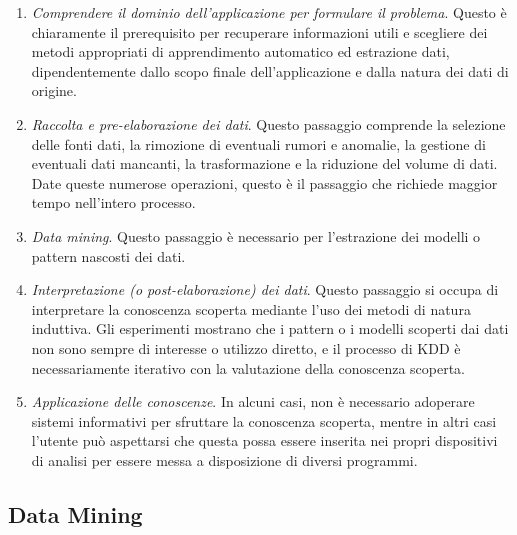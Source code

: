 \begin{enumerate}
    \item \textit{Comprendere il dominio dell’applicazione per formulare il problema}. Questo è chiaramente il prerequisito per recuperare informazioni utili e scegliere dei metodi appropriati di apprendimento automatico ed estrazione dati, dipendentemente dallo scopo finale dell’applicazione e dalla natura dei dati di origine.
    \item \textit{Raccolta e pre-elaborazione dei dati}. Questo passaggio comprende la selezione delle fonti dati, la rimozione di eventuali rumori e anomalie, la gestione di eventuali dati mancanti, la trasformazione e la riduzione del volume di dati. Date queste numerose operazioni, questo è il passaggio che richiede maggior tempo nell’intero processo.
    \item \textit{Data mining}. Questo passaggio è necessario per l’estrazione dei modelli o pattern nascosti dei dati.
    \item \textit{Interpretazione (o post-elaborazione) dei dati}. Questo passaggio si occupa di interpretare la conoscenza scoperta mediante l’uso dei metodi di natura induttiva. Gli esperimenti mostrano che i pattern o i modelli scoperti dai dati non sono sempre di interesse o utilizzo diretto, e il processo di KDD è necessariamente iterativo con la valutazione della conoscenza scoperta.
    \item \textit{Applicazione delle conoscenze}. In alcuni casi, non è necessario adoperare sistemi informativi per sfruttare la conoscenza scoperta, mentre in altri casi l’utente può aspettarsi che questa possa essere inserita nei propri dispositivi di analisi per essere messa a disposizione di diversi programmi.
\end{enumerate}

\subsection{Data Mining}

